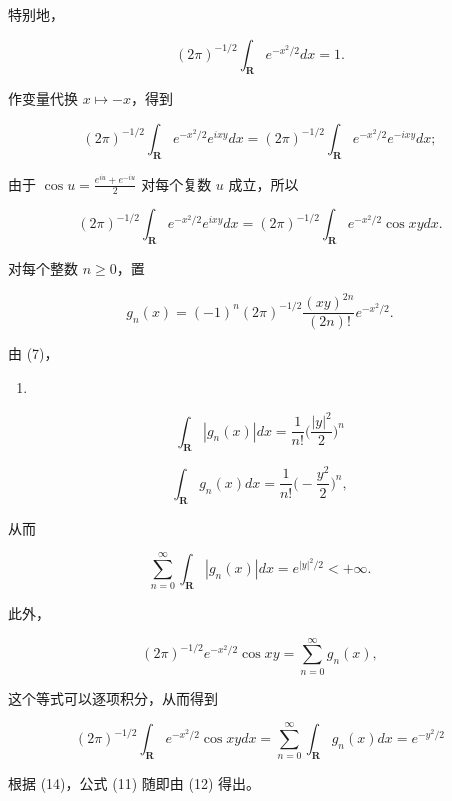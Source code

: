 特别地，

\[
(2 \pi) ^ {- 1 / 2} \int_ {\mathbf {R}} e ^ {- x ^ {2} / 2} d x = 1.
\]

作变量代换 \(x \mapsto -x\)，得到

\[
(2 \pi) ^ {- 1 / 2} \int_ {\mathbf {R}} e ^ {- x ^ {2} / 2} e ^ {i x y} d x = (2 \pi) ^ {- 1 / 2} \int_ {\mathbf {R}} e ^ {- x ^ {2} / 2} e ^ {- i x y} d x;
\]

由于 \(\cos u = \frac{e^{iu} + e^{-iu}}{2}\) 对每个复数 \(u\) 成立，所以

\[
(2 \pi) ^ {- 1 / 2} \int_ {\mathbf {R}} e ^ {- x ^ {2} / 2} e ^ {i x y} d x = (2 \pi) ^ {- 1 / 2} \int_ {\mathbf {R}} e ^ {- x ^ {2} / 2} \cos x y d x.\tag{12}
\]

对每个整数 \(n \geqslant 0\)，置

\[
g _ {n} (x) = (- 1) ^ {n} (2 \pi) ^ {- 1 / 2} \frac {(x y) ^ {2 n}}{(2 n) !} e ^ {- x ^ {2} / 2}.
\]

由 (7)，

\begin{enumerate}
\def\labelenumi{(\arabic{enumi})}
\setcounter{enumi}{12}
\tightlist
\item
\end{enumerate}

\[
\int_ {\mathbf {R}} | g _ {n} (x) | d x = \frac {1}{n !} \biggl (\frac {| y | ^ {2}}{2} \biggr) ^ {n}\tag{14}
\]

\[
\int_ {\mathbf {R}} g _ {n} (x) d x = \frac {1}{n !} \Big (- \frac {y ^ {2}}{2} \Big) ^ {n},
\]

从而

\[
\sum_ {n = 0} ^ {\infty} \int_ {\mathbf {R}} | g _ {n} (x) | d x = e ^ {| y | ^ {2} / 2} <   + \infty .
\]

此外，

\[
(2 \pi) ^ {- 1 / 2} e ^ {- x ^ {2} / 2} \cos x y = \sum_ {n = 0} ^ {\infty} g _ {n} (x),
\]

这个等式可以逐项积分，从而得到

\[
(2 \pi) ^ {- 1 / 2} \int_ {\mathbf {R}} e ^ {- x ^ {2} / 2} \cos x y d x = \sum_ {n = 0} ^ {\infty} \int_ {\mathbf {R}} g _ {n} (x) d x = e ^ {- y ^ {2} / 2}
\]

根据 (14)，公式 (11) 随即由 (12) 得出。

